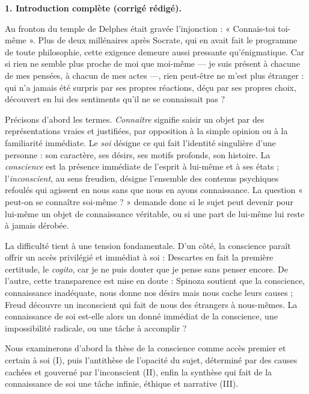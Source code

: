 \documentclass[11pt]{article}
\begin{document}
\begin{corrige}
\textbf{1. Introduction complète (corrigé rédigé).}

Au fronton du temple de Delphes était gravée l'injonction : « Connais-toi toi-même ». Plus de deux millénaires après Socrate, qui en avait fait le programme de toute philosophie, cette exigence demeure aussi pressante qu'énigmatique. Car si rien ne semble plus proche de moi que moi-même — je suis présent à chacune de mes pensées, à chacun de mes actes —, rien peut-être ne m'est plus étranger : qui n'a jamais été surpris par ses propres réactions, déçu par ses propres choix, découvert en lui des sentiments qu'il ne se connaissait pas ?

Précisons d'abord les termes. \emph{Connaître} signifie saisir un objet par des représentations vraies et justifiées, par opposition à la simple opinion ou à la familiarité immédiate. Le \emph{soi} désigne ce qui fait l'identité singulière d'une personne : son caractère, ses désirs, ses motifs profonds, son histoire. La \emph{conscience} est la présence immédiate de l'esprit à lui-même et à ses états ; l'\emph{inconscient}, au sens freudien, désigne l'ensemble des contenus psychiques refoulés qui agissent en nous sans que nous en ayons connaissance. La question « peut-on se connaître soi-même ? » demande donc si le sujet peut devenir pour lui-même un objet de connaissance véritable, ou si une part de lui-même lui reste à jamais dérobée.

La difficulté tient à une tension fondamentale. D'un côté, la conscience paraît offrir un accès privilégié et immédiat à soi : Descartes en fait la première certitude, le \emph{cogito}, car je ne puis douter que je pense sans penser encore. De l'autre, cette transparence est mise en doute : Spinoza soutient que la conscience, connaissance inadéquate, nous donne nos désirs mais nous cache leurs causes ; Freud découvre un inconscient qui fait de nous des étrangers à nous-mêmes. La connaissance de soi est-elle alors un donné immédiat de la conscience, une impossibilité radicale, ou une tâche à accomplir ?

Nous examinerons d'abord la thèse de la conscience comme accès premier et certain à soi (I), puis l'antithèse de l'opacité du sujet, déterminé par des causes cachées et gouverné par l'inconscient (II), enfin la synthèse qui fait de la connaissance de soi une tâche infinie, éthique et narrative (III).


\end{corrige}
\end{document}
